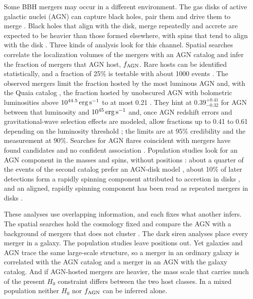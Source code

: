 \documentclass[aps,prd,reprint,twocolumn,superscriptaddress,nofootinbib,floatfix]{revtex4-2}
\newcommand{\fagn}{f_{\rm AGN}}
\begin{document}
Some BBH mergers may occur in a different environment. The gas disks of
active galactic nuclei (AGN) can capture black holes, pair them and drive
them to merge
\cite{Bartos:2016dgn,Stone:2016wzz,Mckernan:2017ssq,Tagawa:2019osr}. Black
holes that align with the disk, merge repeatedly and accrete are expected to
be heavier than those formed elsewhere, with spins that tend to align with
the disk
\cite{Yang:2019okq,Yang:2019cbr,Tagawa:2020dxe,Tagawa:2021ofj,McKernan:2021nwk}.
Three kinds of analysis look for this channel. Spatial searches correlate the
localization volumes of the mergers with an AGN catalog and infer the
fraction of mergers that AGN host, $\fagn$. Rare hosts can be identified
statistically, and a fraction of 25\% is testable with about 1000 events
\cite{Bartos:2017ggb}. The observed mergers limit the fraction hosted by
the most luminous AGN \cite{Veronesi:2023ugk} and, with the Quaia catalog
\cite{Storey-Fisher:2023gca}, the fraction hosted by unobscured AGN with
bolometric luminosities above $10^{44.5}\,{\rm erg\,s^{-1}}$ to at most 0.21
\cite{Veronesi:2024tef}. They hint at $0.39^{+0.41}_{-0.32}$ for AGN between
that luminosity and $10^{45}\,{\rm erg\,s^{-1}}$ \cite{Zhu:2025rdv} and,
once AGN redshift errors and gravitational-wave selection effects are
modeled, allow fractions up to 0.41 to 0.61 depending on the luminosity
threshold \cite{Pouw:2026lar}; the limits are at 95\% credibility and the
measurement at 90\%. Searches for AGN flares coincident
with mergers have found candidates and no confident association
\cite{Graham:2020gwr,Graham:2022xxu,Palmese:2021wcv,Veronesi:2024pjq,Cabrera:2025tzc}.
Population studies look for an AGN component in the masses and spins, without
positions \cite{Gayathri:2023bha}: about a quarter of the events of the
second catalog prefer an AGN-disk model \cite{Gayathri:2021xwb}, about 10\% of
later detections form a rapidly spinning component attributed to accretion
in disks \cite{Bartos:2026xlt}, and an aligned, rapidly spinning component
has been read as repeated mergers in disks \cite{Li:2025iux}.

These analyses use overlapping information, and each fixes what another
infers. The spatial searches hold the cosmology fixed and compare the AGN
with a background of mergers that does not cluster
\cite{Veronesi:2024tef,Zhu:2025rdv,Pouw:2026lar}. The dark siren analyses
place every merger in a galaxy. The population studies leave positions out.
Yet galaxies and AGN trace the same large-scale structure, so a merger in an
ordinary galaxy is correlated with the AGN catalog and a merger in an AGN
with the galaxy catalog. And if AGN-hosted mergers are heavier, the mass
scale that carries much of the present $H_0$ constraint differs between the
two host classes. In a mixed population neither $H_0$ nor $\fagn$ can be
inferred alone.
\end{document}
